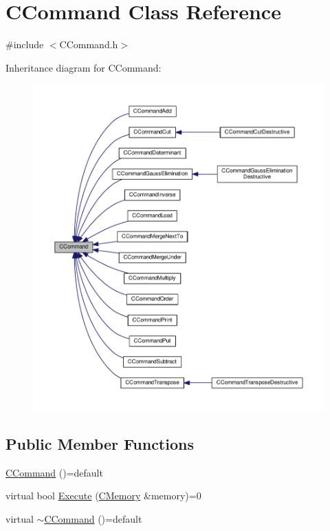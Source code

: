 \hypertarget{classCCommand}{}\section{C\+Command Class Reference}
\label{classCCommand}


{\ttfamily \#include $<$C\+Command.\+h$>$}



Inheritance diagram for C\+Command\+:\nopagebreak
\begin{figure}[H]
\begin{center}
\leavevmode
\includegraphics[width=350pt]{classCCommand__inherit__graph}
\end{center}
\end{figure}
\subsection*{Public Member Functions}
\begin{DoxyCompactItemize}
\item 
\hyperlink{classCCommand_af50175d5481d07679cf015fedff6afa7}{C\+Command} ()=default
\item 
virtual bool \hyperlink{classCCommand_ad9361ea814093c4ebecf22bb0a3f8b79}{Execute} (\hyperlink{classCMemory}{C\+Memory} \&memory)=0
\item 
virtual \hyperlink{classCCommand_a8b2c385d38a996872c963fcff08b3809}{$\sim$\+C\+Command} ()=default
\end{DoxyCompactItemize}
